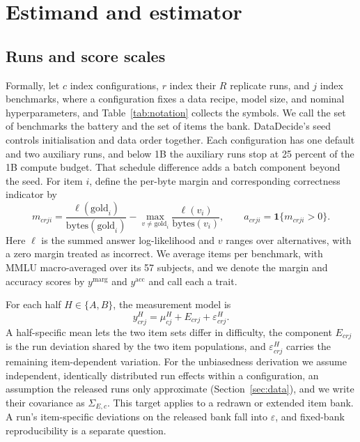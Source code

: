 \documentclass{article}
\begin{document}
\section{Estimand and estimator}
\label{sec:estimator}
\subsection{Runs and score scales}
Formally, let $c$ index configurations, $r$ index their $R$ replicate runs, and $j$ index benchmarks, where a configuration fixes a data recipe, model size, and nominal hyperparameters, and Table~\ref{tab:notation} collects the symbols. We call the set of benchmarks the battery and the set of items the bank. DataDecide's seed controls initialisation and data order together. Each configuration has one default and two auxiliary runs, and below 1B the auxiliary runs stop at 25 percent of the 1B compute budget. That schedule difference adds a batch component beyond the seed. For item $i$, define the per-byte margin and corresponding correctness indicator by
\begin{equation}
m_{crji}=\frac{\ell(\mathrm{gold}_i)}{\mathrm{bytes}(\mathrm{gold}_i)}-
\max_{v\ne\mathrm{gold}_i}\frac{\ell(v_i)}{\mathrm{bytes}(v_i)},
\qquad a_{crji}=\mathbf{1}\{m_{crji}>0\}.
\label{eq:scores}
\end{equation}
Here $\ell$ is the summed answer log-likelihood and $v$ ranges over alternatives, with a zero margin treated as incorrect. We average items per benchmark, with MMLU macro-averaged over its 57 subjects, and we denote the margin and accuracy scores by $y^{\mathrm{marg}}$ and $y^{\mathrm{acc}}$ and call each a trait.

For each half $H\in\{A,B\}$, the measurement model is
\begin{equation}
y^H_{crj}=\mu^H_{cj}+E_{crj}+\varepsilon^H_{crj}.
\label{eq:model}
\end{equation}
A half-specific mean lets the two item sets differ in difficulty, the component $E_{crj}$ is the run deviation shared by the two item populations, and $\varepsilon^H_{crj}$ carries the remaining item-dependent variation. For the unbiasedness derivation we assume independent, identically distributed run effects within a configuration, an assumption the released runs only approximate (Section~\ref{sec:data}), and we write their covariance as $\Sigma_{E,c}$. This target applies to a redrawn or extended item bank. A run's item-specific deviations on the released bank fall into $\varepsilon$, and fixed-bank reproducibility is a separate question.
\end{document}

